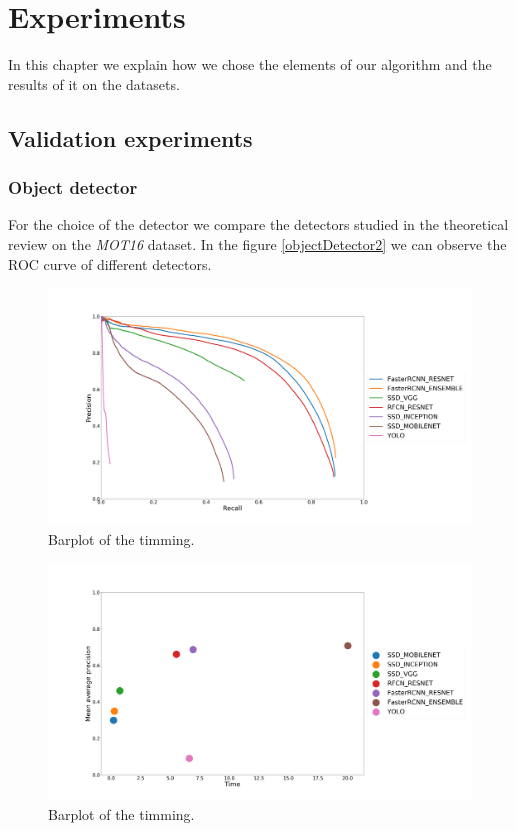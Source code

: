 \chapter{Experiments}\label{cap.experiments}


In this chapter we explain how we chose the elements of our algorithm and the results of it on the datasets.

\section{Validation experiments}



\subsection{Object detector}

For the choice of the detector we compare the detectors studied in the theoretical review on the \textit{MOT16} dataset. In the figure \ref{objectDetector2} we can observe the ROC curve of different detectors.



\begin{figure}[H]
\centering         
\includegraphics[width=0.9\linewidth]{evaluacionObject/dadas.png}
\caption{Barplot of the timming.} \label{timing1}
\end{figure}

\begin{figure}[H]
\centering         
\includegraphics[width=0.9\linewidth]{evaluacionObject/meanAverage2.png}
\caption{Barplot of the timming.} \label{timing1}
\end{figure}



